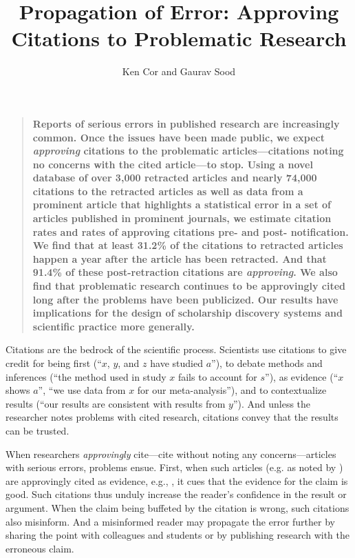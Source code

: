 \documentclass[12pt]{article}
\newenvironment{sciabstract}{%
\begin{quote} \bf}
{\end{quote}}
\begin{document}
\title{Propagation of Error: Approving Citations to Problematic Research} 

\author
{Ken Cor and Gaurav Sood}

\date{}


\baselineskip24pt


\maketitle 

\begin{sciabstract}
Reports of serious errors in published research are increasingly common. Once the issues have been made public, we expect \textit{approving} citations to the problematic articles---citations noting no concerns with the cited article---to stop. Using a novel database of over 3,000 retracted articles and nearly 74,000 citations to the retracted articles as well as data from a prominent article that highlights a statistical error in a set of articles published in prominent journals, we estimate citation rates and rates of approving citations pre- and post- notification. We find that at least 31.2\% of the citations to retracted articles happen a year after the article has been retracted. And that 91.4\% of these post-retraction citations are \textit{approving}. We also find that problematic research continues to be approvingly cited long after the problems have been publicized. Our results have implications for the design of scholarship discovery systems and scientific practice more generally.
\end{sciabstract}

\clearpage

Citations are the bedrock of the scientific process. Scientists use citations to give credit for being first (``$x$, $y$, and $z$ have studied $a$''), to debate methods and inferences (``the method used in study $x$ fails to account for $s$''), as evidence (``$x$ shows $a$'', ``we use data from $x$ for our meta-analysis''), and to contextualize results (``our results are consistent with results from $y$''). And unless the researcher notes problems with cited research, citations convey that the results can be trusted.

When researchers \textit{approvingly} cite---cite without noting any concerns---articles with serious errors, problems ensue. First, when such articles (e.g. \cite{rubio2005spontaneous} as noted by \cite{torsvik2010spontaneous}) are approvingly cited as evidence, e.g., \cite{chang2013safety}, it cues that the evidence for the claim is good. Such citations thus unduly increase the reader's confidence in the result or argument. When the claim being buffeted by the citation is wrong, such citations also misinform. And a misinformed reader may propagate the error further by sharing the point with colleagues and students or by publishing research with the erroneous claim.
\end{document}
